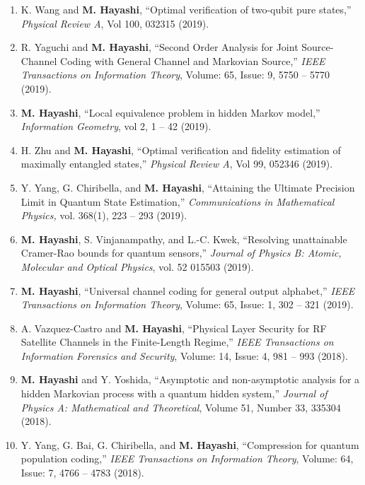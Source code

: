 \documentclass[a4paper,12pt,oneside]{article}
\begin{document}
\begin{enumerate}
\item 
K. Wang and \textbf{M. Hayashi},
``Optimal verification of two-qubit pure states,''
{\em Physical Review A}, 
Vol 100, 032315 (2019).

\item 
R. Yaguchi and \textbf{M. Hayashi}, 
``Second Order Analysis for Joint Source-Channel Coding with General Channel and Markovian Source,''
{\em IEEE Transactions on Information Theory}, 
Volume: 65, Issue: 9, 5750 -- 5770 (2019). 

\item 
\textbf{M. Hayashi}, 
``Local equivalence problem in hidden Markov model,''
{\em Information Geometry}, 
vol 2, 1 -- 42 (2019). 

\item 
H. Zhu and \textbf{M. Hayashi}, 
``Optimal verification and fidelity estimation of maximally entangled states,''
{\em Physical Review A}, Vol 99, 052346 (2019).

\item 
Y. Yang, G. Chiribella, and \textbf{M. Hayashi}, 
``Attaining the Ultimate Precision Limit in Quantum State Estimation,''
{\em Communications in Mathematical Physics,}
vol. 368(1), 223 -- 293 (2019). 

\item 
\textbf{M. Hayashi}, S. Vinjanampathy, and L.-C. Kwek, 
``Resolving unattainable Cramer-Rao bounds for quantum sensors,''
{\em Journal of Physics B: Atomic, Molecular and Optical Physics},
vol. 52 015503 (2019). 

\item 
\textbf{M. Hayashi},
``Universal channel coding for general output alphabet,'' 
{\em IEEE Transactions on Information Theory},
Volume: 65, Issue: 1, 302 -- 321 (2019). 

\item 
A. Vazquez-Castro and \textbf{M. Hayashi},
``Physical Layer Security for RF Satellite Channels in the Finite-Length Regime,'' 
{\em IEEE Transactions on Information Forensics and Security},
Volume: 14, Issue: 4,  981 -- 993 (2018).

\item 
\textbf{M. Hayashi} and Y. Yoshida,
``Asymptotic and non-asymptotic analysis for a hidden Markovian process with a quantum hidden system,''
{\em Journal of Physics A: Mathematical and Theoretical}, 
Volume 51, Number 33, 335304 (2018).

\item 
Y. Yang, G. Bai, G. Chiribella, and \textbf{M. Hayashi}, 
``Compression for quantum population coding,''
{\em IEEE Transactions on Information Theory},
Volume: 64, Issue: 7, 4766 -- 4783 (2018). 


\end{enumerate}
\end{document}
